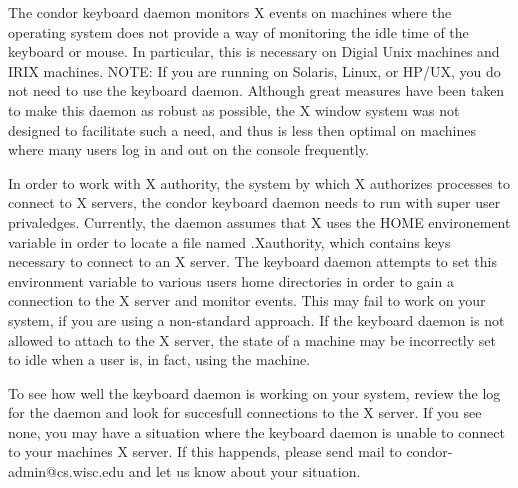 	The condor keyboard daemon monitors X events on machines where the
operating system does not provide a way of monitoring the idle time of the
keyboard or mouse.  In particular, this is necessary on Digial Unix machines
and IRIX machines.  NOTE: If you are running on Solaris, Linux, or HP/UX, you
do not need to use the keyboard daemon. Although great measures have been
taken to make this daemon as robust as possible, the X window system was not
designed to facilitate such a need, and thus is less then optimal on machines
where many users log in and out on the console frequently.

	In order to work with X authority, the system by which X authorizes 
processes to connect to X servers, the condor keyboard daemon needs to run
with super user privaledges.  Currently, the daemon assumes that X uses the
HOME environement variable in order to locate a file named .Xauthority, which
contains keys necessary to connect to an X server.  The keyboard daemon
attempts to set this environment variable to various users home directories in
order to gain a connection to the X server and monitor events.  This may fail
to work on your system, if you are using a non-standard approach.  If the
keyboard daemon is not allowed to attach to the X server, the state of a
machine may be incorrectly set to idle when a user is, in fact, using the
machine.

	To see how well the keyboard daemon is working on your system, review
the log for the daemon and look for succesfull connections to the X
server.  If you see none, you may have a situation where the keyboard daemon
is unable to connect to your machines X server.  If this happends, please
send mail to condor-admin@cs.wisc.edu and let us know about your situation.

